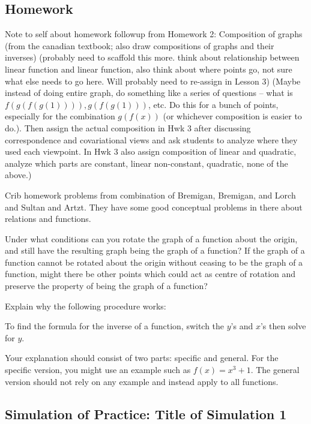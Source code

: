 \documentclass[11pt]{article}
\theoremstyle{definition}
\begin{document}
\newpage \subsection{Homework}


Note to self about homework followup from Homework 2: 
Composition of graphs (from the canadian textbook; also draw compositions of graphs and their inverses) (probably need to scaffold this more. think about relationship between linear function and linear function, also think about where points go, not sure what else needs to go here. Will probably need to re-assign in Lesson 3) (Maybe instead of doing entire graph, do something like a series of questions -- what is $f(g(f(g(1)))), g(f(g(1)))$, etc. Do this for a bunch of points, especially for the combination $g(f(x))$ (or whichever composition is easier to do.). Then assign the actual composition in Hwk 3 after discussing correspondence and covariational views and ask students to analyze where they used each viewpoint. In Hwk 3 also assign composition of linear and quadratic, analyze which parts are constant, linear non-constant, quadratic, none of the above.)


Crib homework problems from combination of Bremigan, Bremigan, and Lorch and Sultan and Artzt. They have some good conceptual problems in there about relations and functions.


Under what conditions can you rotate the graph of a function about the origin, and still have the resulting graph being the graph of a function? If the graph of a function cannot be rotated about the origin without ceasing to be the graph of a function, might there be other points which could act as centre of rotation and preserve the property of being the graph of a function?

Explain why the following procedure works:

To find the formula for the inverse of a function, switch the $y$'s and $x$'s then solve for $y$.

Your explanation should consist of two parts: specific and general. For the specific version, you might use an example such as $f(x)=x^3+1$. The general version should not rely on any example and instead apply to all functions.

\newpage \subsection{Simulation of Practice: Title of Simulation 1}
\end{document}
